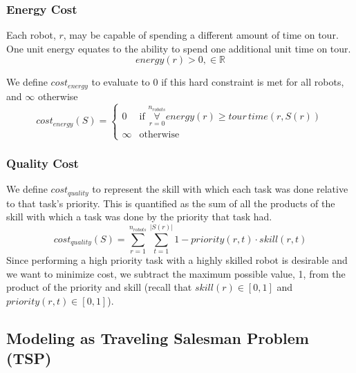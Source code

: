 \documentclass[a4paper]{article}
\begin{document}
\subsubsection{Energy Cost}

Each robot, $r$, may be capable of spending a different amount of time on tour. One unit energy equates to the ability to spend one additional unit time on tour.
$$\mathit{energy}(r) > 0, \in \mathbb{R}$$

We define $\mathit{cost}_\mathit{energy}$ to evaluate to 0 if this hard constraint is met for all robots, and $\infty$ otherwise
$$
\mathit{cost}_\mathit{energy}(S) = \begin{cases}
0 & \text{if } \mathop{\forall}\limits_{r=0}^{n_\mathit{robots}} \mathit{energy}(r) \geq \mathit{tour \, time}(r, S(r)) \\
\infty & \text{otherwise}
\end{cases}
$$

\subsubsection{Quality Cost}

We define $\mathit{cost}_\mathit{quality}$ to represent the skill with which each task was done relative to that task's priority. This is quantified as the sum of all the products of the skill with which a task was done by the priority that task had.
$$
\mathit{cost}_\mathit{quality}(S) =
  \sum^{n_\mathit{robots}}_{r=1}
  \sum^{|S(r)|}_{t=1}
  1 - \mathit{priority}(r, t) \cdot \mathit{skill}(r, t)
$$
Since performing a high priority task with a highly skilled robot is desirable and we want to minimize cost, we subtract the maximum possible value, 1, from the product of the priority and skill (recall that $\mathit{skill}(r) \in [0, 1]$ and $\mathit{priority}(r, t) \in [0, 1]$).


\subsection{Modeling as Traveling Salesman Problem (TSP)}
\end{document}
